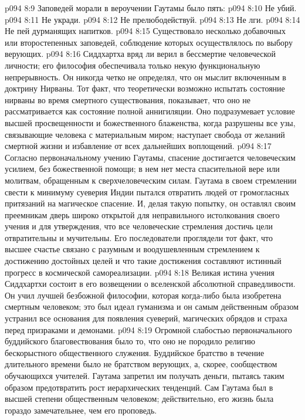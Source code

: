 \vs p094 8:9 \pc Заповедей морали в вероучении Гаутамы было пять:
\vs p094 8:10 \bibnobreakspace Не убий.
\vs p094 8:11 \bibnobreakspace Не укради.
\vs p094 8:12 \bibnobreakspace Не прелюбодействуй.
\vs p094 8:13 \bibnobreakspace Не лги.
\vs p094 8:14 \bibnobreakspace Не пей дурманящих напитков.
\vs p094 8:15 \pc Существовало несколько добавочных или второстепенных заповедей, соблюдение которых осуществлялось по выбору верующих.
\vs p094 8:16 \pc Сиддхартха вряд ли верил в бессмертие человеческой личности; его философия обеспечивала только некую функциональную непрерывность. Он никогда четко не определял, что он мыслит включенным в доктрину Нирваны. Тот факт, что теоретически возможно испытать состояние нирваны во время смертного существования, показывает, что оно не рассматривается как состояние полной аннигиляции. Оно подразумевает условие высшей просвещенности и божественного блаженства, когда разрушены все узы, связывающие человека с материальным миром; наступает свобода от желаний смертной жизни и избавление от всех дальнейших воплощений.
\vs p094 8:17 Согласно первоначальному учению Гаутамы, спасение достигается человеческим усилием, без божественной помощи; в нем нет места спасительной вере или молитвам, обращенным к сверхчеловеческим силам. Гаутама в своем стремлении свести к минимуму суеверия Индии пытался отвратить людей от громогласных притязаний на магическое спасение. И, делая такую попытку, он оставлял своим преемникам дверь широко открытой для неправильного истолкования своего учения и для утверждения, что все человеческие стремления достичь цели отвратительны и мучительны. Его последователи проглядели тот факт, что высшее счастье связано с разумным и воодушевленным стремлением к достижению достойных целей и что такие достижения составляют истинный прогресс в космической самореализации.
\vs p094 8:18 Великая истина учения Сиддхартхи состоит в его возвещении о вселенской абсолютной справедливости. Он учил лучшей безбожной философии, которая когда\hyp{}либо была изобретена смертным человеком; это был идеал гуманизма и он самым действенным образом устранил все основания для появления суеверий, магических обрядов и страха перед призраками и демонами.
\vs p094 8:19 Огромной слабостью первоначального буддийского благовествования было то, что оно не породило религию бескорыстного общественного служения. Буддийское братство в течение длительного времени было не братством верующих, а, скорее, сообществом обучающихся учителей. Гаутама запретил им получать деньги, пытаясь таким образом предотвратить рост иерархических тенденций. Сам Гаутама был в высшей степени общественным человеком; действительно, его жизнь была гораздо замечательнее, чем его проповедь.
